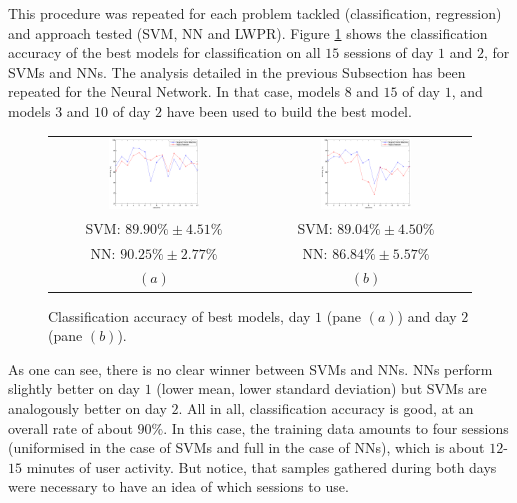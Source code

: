 This procedure was repeated for each problem tackled (classification,
regression) and approach tested (SVM, NN and LWPR). Figure
\ref{fig:best_class} shows the classification accuracy of the best
models for classification on all $15$ sessions of day $1$ and $2$, for
SVMs and NNs. The analysis detailed in the previous Subsection has
been repeated for the Neural Network. In that case, models $8$ and
$15$ of day $1$, and models $3$ and $10$ of day $2$ have been used to
build the best model.

\begin{figure}[!ht] \centering
  \begin{tabular}{cc}
    \includegraphics[width=0.45\textwidth]{figs/fig_class_resCrossBestOnDay1} & \includegraphics[width=0.45\textwidth]{figs/fig_class_resCrossBestOnDay2} \\
    SVM: $89.90\% \pm 4.51\%$ & SVM: $89.04\% \pm 4.50\%$ \\
    NN: $90.25\% \pm 2.77\%$ & NN: $86.84\% \pm 5.57\%$ \\
    $(a)$ & $(b)$ \\
  \end{tabular}
  \caption{Classification accuracy of best models, day $1$ (pane
  $(a)$) and day $2$ (pane $(b)$).}
  \label{fig:best_class}
\end{figure}

As one can see, there is no clear winner between SVMs and NNs. NNs
perform slightly better on day $1$ (lower mean, lower standard
deviation) but SVMs are analogously better on day $2$. All in all,
classification accuracy is good, at an overall rate of about
$90\%$. In this case, the training data amounts to four sessions
(uniformised in the case of SVMs and full in the case of NNs), which
is about $12$-$15$ minutes of user activity. But notice, that samples
gathered during both days were necessary to have an idea of which
sessions to use.

